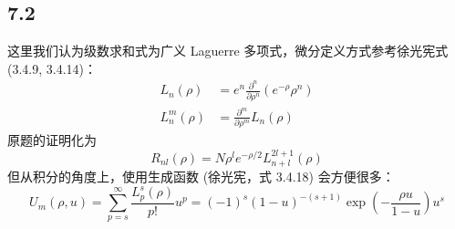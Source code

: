 \subsection{7.2}
这里我们认为级数求和式为广义 Laguerre 多项式，微分定义方式参考徐光宪式 (3.4.9, 3.4.14)：
\begin{align}
L_n (\rho) &= e^n \frac{\partial^n}{\partial \rho^n} (e^{-\rho} \rho^n) \\
L_n^m (\rho) &= \frac{\partial^m}{\partial \rho^m} L_n (\rho)
\end{align}
原题的证明化为
\begin{equation}
R_{nl} (\rho) = N \rho^l e^{- \rho / 2} L_{n + l}^{2 l + 1} (\rho)
\end{equation}
但从积分的角度上，使用生成函数 (徐光宪，式 3.4.18) 会方便很多：
\begin{equation}
U_m (\rho, u) = \sum_{p = s}^\infty \frac{L_p^s (\rho)}{p!} u^p = (-1)^s (1 - u)^{- (s + 1)} \exp \left( - \frac{\rho u}{1 - u} \right) u^s
\end{equation}

